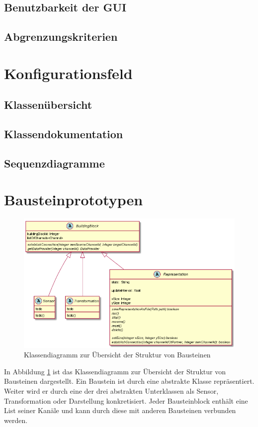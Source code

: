 \documentclass[parskip=full]{scrartcl}
\begin{document}
\subsection {Benutzbarkeit der GUI}

\subsection{Abgrenzungskriterien}


\clearpage
\section{Konfigurationsfeld}

\subsection{Klassenübersicht}

\subsection{Klassendokumentation}

\subsection{Sequenzdiagramme}

\clearpage
\section{Bausteinprototypen}

\begin{figure}[htbp]
	\begin{center}
		\includegraphics[width = 16cm]{Grafik/Blocks.png}
		\caption{Klassendiagramm zur Übersicht der Struktur von Bausteinen }
		\label{class-Blocks}
	\end{center}
\end{figure}
In Abbildung \ref{class-Blocks} ist das Klassendiagramm zur Übersicht der Struktur von Bausteinen dargestellt. Ein Baustein ist durch eine abstrakte Klasse repräsentiert. Weiter wird er durch eine der drei abstrakten Unterklassen als Sensor, Transformation oder Darstellung konkretisiert. Jeder Bausteinblock enthält eine List seiner Kanäle und kann durch diese mit anderen Bausteinen verbunden werden.
\end{document}
